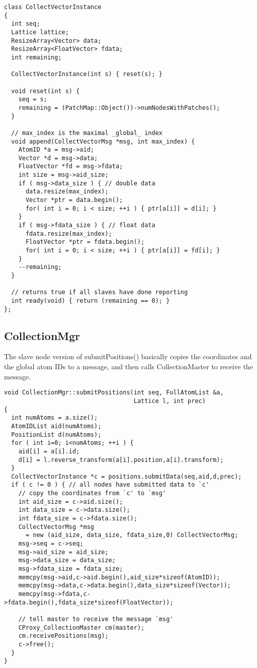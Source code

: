 \documentclass{article}
\begin{document}
\begin{lstlisting}
class CollectVectorInstance
{
  int seq;
  Lattice lattice;
  ResizeArray<Vector> data;
  ResizeArray<FloatVector> fdata;
  int remaining;

  CollectVectorInstance(int s) { reset(s); }

  void reset(int s) {
    seq = s;
    remaining = (PatchMap::Object())->numNodesWithPatches();
  }

  // max_index is the maximal _global_ index
  void append(CollectVectorMsg *msg, int max_index) {
    AtomID *a = msg->aid;
    Vector *d = msg->data;
    FloatVector *fd = msg->fdata;
    int size = msg->aid_size;
    if ( msg->data_size ) { // double data
      data.resize(max_index);
      Vector *ptr = data.begin();
      for( int i = 0; i < size; ++i ) { ptr[a[i]] = d[i]; }
    }
    if ( msg->fdata_size ) { // float data
      fdata.resize(max_index);
      FloatVector *ptr = fdata.begin();
      for( int i = 0; i < size; ++i ) { ptr[a[i]] = fd[i]; }
    }
    --remaining;
  }

  // returns true if all slaves have done reporting
  int ready(void) { return (remaining == 0); }
};
\end{lstlisting}



\subsection{CollectionMgr}




The slave node version of submitPositions() basically
copies the coordinates and the global atom IDs to
a message, and then calls CollectionMaster to receive the message.
%
\begin{lstlisting}
void CollectionMgr::submitPositions(int seq, FullAtomList &a,
                                    Lattice l, int prec)
{
  int numAtoms = a.size();
  AtomIDList aid(numAtoms);
  PositionList d(numAtoms);
  for ( int i=0; i<numAtoms; ++i ) {
    aid[i] = a[i].id;
    d[i] = l.reverse_transform(a[i].position,a[i].transform);
  }
  CollectVectorInstance *c = positions.submitData(seq,aid,d,prec);
  if ( c != 0 ) { // all nodes have submitted data to `c'
    // copy the coordinates from `c' to `msg'
    int aid_size = c->aid.size();
    int data_size = c->data.size();
    int fdata_size = c->fdata.size();
    CollectVectorMsg *msg
      = new (aid_size, data_size, fdata_size,0) CollectVectorMsg;
    msg->seq = c->seq;
    msg->aid_size = aid_size;
    msg->data_size = data_size;
    msg->fdata_size = fdata_size;
    memcpy(msg->aid,c->aid.begin(),aid_size*sizeof(AtomID));
    memcpy(msg->data,c->data.begin(),data_size*sizeof(Vector));
    memcpy(msg->fdata,c->fdata.begin(),fdata_size*sizeof(FloatVector));

    // tell master to receive the message `msg'
    CProxy_CollectionMaster cm(master);
    cm.receivePositions(msg);
    c->free();
  }
}
\end{lstlisting}
\end{document}
